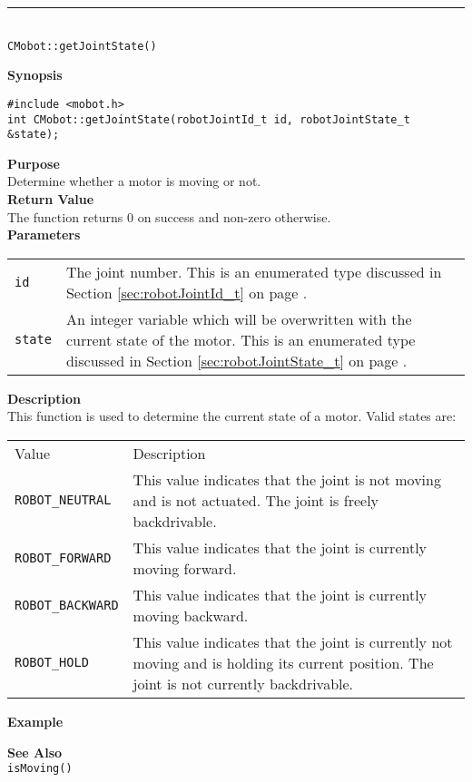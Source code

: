 \noindent
\vspace{5pt}
\rule{4.5in}{0.015in}\\
\noindent
{\LARGE \texttt{CMobot::getJointState()}}\\
{}

\noindent
{\bf Synopsis}
\vspace{-8pt}
\begin{verbatim}
#include <mobot.h>
int CMobot::getJointState(robotJointId_t id, robotJointState_t &state);
\end{verbatim}

\noindent
{\bf Purpose}\\
Determine whether a motor is moving or not.\\

\noindent
{\bf Return Value}\\
The function returns 0 on success and non-zero otherwise.\\

\noindent
{\bf Parameters}
\vspace{-0.1in}
\begin{description}
\item               
\begin{tabular}{p{10 mm}p{145 mm}}
\texttt{id} & The joint number. This is an enumerated type 
discussed in Section \ref{sec:robotJointId_t} on page
\pageref{sec:robotJointId_t}.\\
\texttt{state} & An integer variable which will be overwritten with the current state of the motor. 
This is an enumerated type 
discussed in Section \ref{sec:robotJointState_t} on page
\pageref{sec:robotJointState_t}.
\end{tabular}
\end{description}

\noindent
{\bf Description}\\
This function is used to determine the current state of a motor. Valid states are:

\begin{tabular}{p{3.3cm}p{10cm}} \hline 
Value & Description \\
\texttt{ROBOT\_NEUTRAL}& This value indicates that the joint is not moving and is not actuated. The joint is freely backdrivable. \\
\texttt{ROBOT\_FORWARD}& This value indicates that the joint is currently moving forward. \\
\texttt{ROBOT\_BACKWARD}& This value indicates that the joint is currently moving backward. \\
\texttt{ROBOT\_HOLD}& This value indicates that the joint is currently not moving and is holding its current position. The joint is not currently backdrivable. \\
\hline
\end{tabular}


\noindent
{\bf Example}\\
\noindent

\noindent
{\bf See Also}\\
\texttt{isMoving()}
